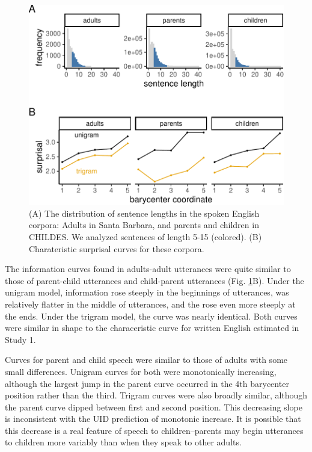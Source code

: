 \documentclass[entropy,article,submit,moreauthors,pdftex]{mdpi}
\begin{document}
\begin{figure}[tb]

{\centering \includegraphics{figs/spoken-figs-1} 

}

\caption{(A) The distribution of sentence lengths in the spoken English corpora: Adults in Santa Barbara, and parents and children in CHILDES. We analyzed sentences of length 5-15 (colored). (B) Charateristic surprisal curves for these corpora.}\label{fig:spoken-figs}
\end{figure}

The information curves found in adults-adult utterances were quite
similar to those of parent-child utterances and child-parent utterances
(Fig. \ref{fig:spoken-figs}B). Under the unigram model, information rose
steeply in the beginnings of utterances, was relatively flatter in the
middle of utterances, and the rose even more steeply at the ends. Under
the trigram model, the curve was nearly identical. Both curves were
similar in shape to the characeristic curve for written English
estimated in Study 1.

Curves for parent and child speech were similar to those of adults with
some small differences. Unigram curves for both were monotonically
increasing, although the largest jump in the parent curve occurred in
the 4th barycenter position rather than the third. Trigram curves were
also broadly similar, although the parent curve dipped between first and
second position. This decreasing slope is inconsistent with the UID
prediction of monotonic increase. It is possible that this decrease is a
real feature of speech to children--parents may begin utterances to
children more variably than when they speak to other adults.
\end{document}
